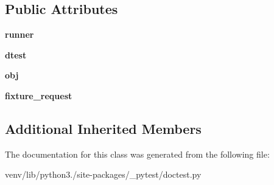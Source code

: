 \subsection*{Public Attributes}
\begin{DoxyCompactItemize}
\item 
\mbox{\label{class__pytest_1_1doctest_1_1_doctest_item_ac349b192d635dc19975d82bec1a2d50c}} 
{\bfseries runner}
\item 
\mbox{\label{class__pytest_1_1doctest_1_1_doctest_item_a7d65abec694e540e7139d0c2218298e8}} 
{\bfseries dtest}
\item 
\mbox{\label{class__pytest_1_1doctest_1_1_doctest_item_a49a3c40f26e58e353be22fbda9d83ec4}} 
{\bfseries obj}
\item 
\mbox{\label{class__pytest_1_1doctest_1_1_doctest_item_af2282f665fe910dee34b04edd57c17f9}} 
{\bfseries fixture\+\_\+request}
\end{DoxyCompactItemize}
\subsection*{Additional Inherited Members}


The documentation for this class was generated from the following file\+:\begin{DoxyCompactItemize}
\item 
venv/lib/python3./site-\/packages/\+\_\+pytest/doctest.\+py\end{DoxyCompactItemize}
